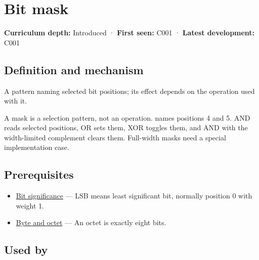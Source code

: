 \hypertarget{appendix-dbe5905163c2}{}\label{referencestart:appendix-dbe5905163c2}
\section{Bit mask}\label{appendix-dbe5905163c2-bit-mask}

\hypertarget{appendix-dbe5905163c2-bit-mask}{}

\textbf{Curriculum depth:} Introduced · \textbf{First seen:} C001 · \textbf{Latest development:} C001

\begin{allmightroledefinition}

\subsection{Definition and mechanism}\label{appendix-dbe5905163c2-definition-and-mechanism}

\hypertarget{appendix-dbe5905163c2-definition-and-mechanism}{}

A pattern naming selected bit positions; its effect depends on the operation used with it.

\end{allmightroledefinition}

A mask is a selection pattern, not an operation.  names positions 4 and 5. AND reads selected positions, OR sets them, XOR toggles them, and AND with the width-limited complement clears them. Full-width masks need a special implementation case.

\subsection{Prerequisites}\label{appendix-dbe5905163c2-prerequisites}

\hypertarget{appendix-dbe5905163c2-prerequisites}{}

\begin{itemize}
\tightlist
\item
  \hyperref[appendix-280445746493]{Bit significance} --- LSB means least significant bit, normally position 0 with weight 1.
\item
  \hyperref[appendix-5bee2df85484]{Byte and octet} --- An octet is exactly eight bits.
\end{itemize}

\subsection{Used by}\label{appendix-dbe5905163c2-used-by}

